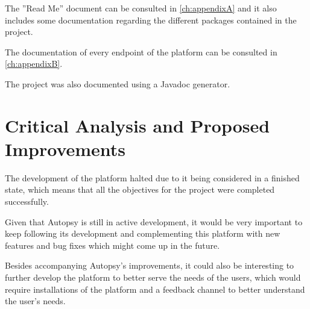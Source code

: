 The ''Read Me'' document can be consulted in \autoref{ch:appendixA} and it also includes some documentation regarding the different packages contained in the project.

The documentation of every endpoint of the platform can be consulted in \autoref{ch:appendixB}.

The project was also documented using a Javadoc \cite{javadoc} generator.

\section{Critical Analysis and Proposed Improvements}

The development of the platform halted due to it being considered in a finished state, which means that all the objectives for the project were completed successfully.

Given that Autopsy is still in active development, it would be very important to keep following its development and complementing this platform with new features and bug fixes which might come up in the future.

Besides accompanying Autopsy's improvements, it could also be interesting to further develop the platform to better serve the needs of the users, which would require installations of the platform and a feedback channel to better understand the user's needs.
